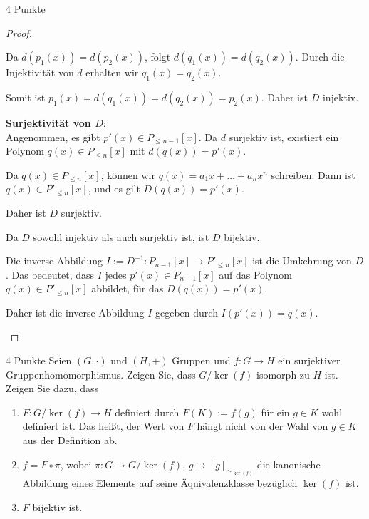 \documentclass{problemset}
\begin{document}
\begin{problem}{4 Punkte}
\begin{proof}
\begin{enumerate}
		      Da $d(p_1(x)) = d(p_2(x))$, folgt $d(q_1(x)) = d(q_2(x))$. Durch die Injektivität von $d$ erhalten wir $q_1(x) = q_2(x)$.

		      Somit ist $p_1(x) = d(q_1(x)) = d(q_2(x)) = p_2(x)$. Daher ist $D$ injektiv.
		      \checkmark

		      \textbf{Surjektivität von $D$}: \\
		      Angenommen, es gibt $p'(x) \in P_{\le n-1}[x]$. Da $d$ surjektiv ist, existiert ein Polynom $q(x) \in P_{\le n}[x]$ mit $d(q(x)) = p'(x)$.

		      Da $q(x) \in P_{\le n}[x]$, können wir $q(x) = a_1x + \ldots + a_nx^n$ schreiben. Dann ist $q(x) \in P'_{\le n}[x]$, und es gilt $D(q(x)) = p'(x)$.

		      Daher ist $D$ surjektiv.
		      \checkmark

		      Da $D$ sowohl injektiv als auch surjektiv ist, ist $D$ bijektiv.

		      Die inverse Abbildung $I := D^{-1}: P_{n-1}[x] \to P'_{\le n}[x]$ ist die Umkehrung von $D$. Das bedeutet, dass $I$ jedes $p'(x) \in P_{n-1}[x]$ auf das Polynom $q(x) \in P'_{\le n}[x]$ abbildet, für das $D(q(x)) = p'(x)$.

		      Daher ist die inverse Abbildung $I$ gegeben durch $I(p'(x)) = q(x)$.
	\end{enumerate}
\end{proof}

\end{problem}

\begin{problem}{4 Punkte}
Seien $(G, \cdot)$ und $(H, +)$ Gruppen und $f: G \to H$ ein surjektiver Gruppenhomomorphismus. Zeigen Sie, dass $G/\ker(f)$ isomorph zu $H$ ist. Zeigen Sie dazu, dass
\begin{enumerate}
	\item $F: G/\ker(f) \to H$ definiert durch $F(K) := f(g)$ für ein $g \in K$ wohl definiert ist. Das heißt, der Wert von $F$ hängt nicht von der Wahl von $g \in K$ aus der Definition ab.
	\item $f = F \circ \pi$, wobei $\pi: G \to G/\ker(f)$, $g \mapsto [g]_{\sim_{\ker(f)}}$ die kanonische Abbildung eines Elements auf seine Äquivalenzklasse bezüglich $\ker(f)$ ist.
	\item $F$ bijektiv ist.
\end{enumerate}

\end{problem}
\end{document}
